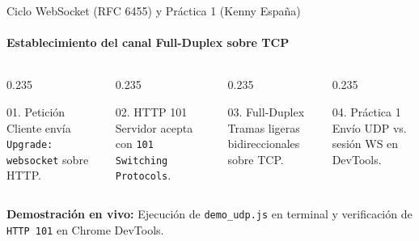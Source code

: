 \documentclass[aspectratio=169,10pt]{beamer}
\begin{document}
\begin{frame}{Ciclo WebSocket (RFC 6455) y Práctica 1 (Kenny España)}
  \framesubtitle{Establecimiento del canal Full-Duplex sobre TCP \cite{ref3,mitrovic2023websocket}}
  \vspace{0.2cm}
  \begin{columns}[T,totalwidth=\textwidth]
    \begin{column}{0.235\textwidth}
      \begin{bluecard}{01. Petición}
        \footnotesize Cliente envía \texttt{Upgrade: websocket} sobre HTTP.
      \end{bluecard}
    \end{column}
    \begin{column}{0.235\textwidth}
      \begin{bluecard}{02. HTTP 101}
        \footnotesize Servidor acepta con \texttt{101 Switching Protocols}.
      \end{bluecard}
    \end{column}
    \begin{column}{0.235\textwidth}
      \begin{bluecard}{03. Full-Duplex}
        \footnotesize Tramas ligeras bidireccionales sobre TCP.
      \end{bluecard}
    \end{column}
    \begin{column}{0.235\textwidth}
      \begin{ambercard}{04. Práctica 1}
        \footnotesize Envío UDP vs. sesión WS en DevTools.
      \end{ambercard}
    \end{column}
  \end{columns}
  \vspace{0.5cm}
  \begin{demobar}
    \textcolor{AmberAccent}{\textbf{Demostración en vivo:}} Ejecución de \texttt{demo\_udp.js} en terminal y verificación de \texttt{HTTP 101} en Chrome DevTools.
  \end{demobar}
\end{frame}
\end{document}
